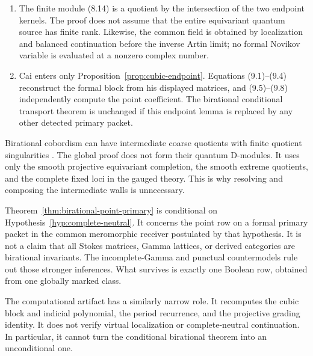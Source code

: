\begin{enumerate}[label=\textup{(\arabic*)}]
  input, not as a consequence of their theorem.
\item The finite module (8.14) is a quotient by the intersection of the two
  endpoint kernels.  The proof does not assume that the entire equivariant
  quantum source has finite rank.  Likewise, the common field is obtained by
  localization and balanced continuation before the inverse Artin limit; no
  formal Novikov variable is evaluated at a nonzero complex number.
\item Cai enters only Proposition~\ref{prop:cubic-endpoint}.  Equations
  (9.1)--(9.4) reconstruct the formal block from his displayed matrices, and
  (9.5)--(9.8) independently compute the point coefficient.  The birational
  conditional transport theorem is unchanged if this endpoint lemma is replaced by any
  other detected primary packet.
\end{enumerate}

Birational cobordism can have intermediate coarse quotients with finite
quotient singularities \cite{Wlodarczyk,AKMW}.  The global proof does not form
their quantum D-modules.  It uses only the smooth projective equivariant
completion, the smooth extreme quotients, and the complete fixed loci in the
gauged theory.  This is why resolving and composing the intermediate walls is
unnecessary.

Theorem~\ref{thm:birational-point-primary} is conditional on
Hypothesis~\ref{hyp:complete-neutral}.  It concerns the point row on a formal
primary packet in the common meromorphic receiver postulated by that
hypothesis.
It is not a claim that all Stokes matrices, Gamma lattices, or derived
categories are birational invariants.  The incomplete-Gamma and punctual
countermodels rule out those stronger inferences.  What survives is exactly
one Boolean row, obtained from one globally marked class.

The computational artifact has a similarly narrow role.  It recomputes the
cubic block and indicial polynomial, the period recurrence, and the
projective grading identity.  It does not verify virtual localization or
complete-neutral continuation.  In particular, it cannot turn the
conditional birational theorem into an unconditional one.
